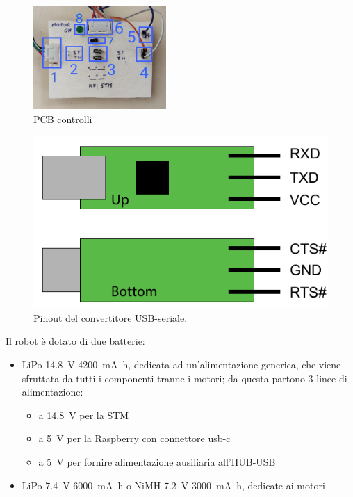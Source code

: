 \begin{figure}[] 
	\centering
	\includegraphics[width=0.45\textwidth]{pcb_controlli.png}
	\caption{PCB controlli}
	\label{fig:pcb_controlli}
\end{figure}


\begin{figure}
	\centering    
	\includegraphics[height=0.2\textheight]{seriale_pinout.pdf}
	\caption{Pinout del convertitore USB-seriale.}
	\label{fig: pinout usbserial}
\end{figure}


Il robot è dotato di due batterie:
\begin{itemize}
	\item LiPo \SI{14.8}{\volt} \SI{4200}{\milli \ampere \hour}, dedicata ad un’alimentazione generica, che viene sfruttata da tutti i componenti tranne i motori; 
	da questa partono 3 linee di alimentazione: 
	\begin{itemize}
		\item a \SI{14.8}{\volt} per la STM
		\item a \SI{5}{\volt} per la Raspberry con connettore usb-c
		\item a \SI{5}{\volt} per fornire alimentazione ausiliaria all’HUB-USB
	\end{itemize}
	\item LiPo \SI{7.4}{\volt} \SI{6000}{\milli \ampere \hour} o NiMH \SI{7.2}{\volt} \SI{3000}{\milli \ampere \hour}, dedicate ai motori
\end{itemize}

